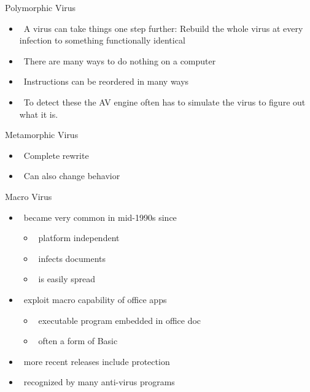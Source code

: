 \documentclass{beamer}
\begin{document}
\begin{frame}{Polymorphic Virus }
  \begin{itemize}
  \item  A virus can take things one step further: 
    Rebuild the whole virus at every infection to 
    something functionally identical 
  \item  There are many ways to do nothing on a 
    computer 
  \item  Instructions can be reordered in many ways 
  \item  To detect these the AV engine often has to 
    simulate the virus to figure out what it is.
  \end{itemize}
\end{frame}

\begin{frame}{Metamorphic Virus}
  \begin{itemize}
  \item  Complete rewrite 
  \item  Can also change behavior
  \end{itemize}
\end{frame}
 
\begin{frame}{Macro Virus }
  \begin{itemize}
  \item  became very common in mid-1990s since 
    \begin{itemize}
    \item  platform independent 
    \item  infects documents 
    \item  is easily spread 
    \end{itemize}
  \item  exploit macro capability of office apps 
    \begin{itemize}
    \item  executable program embedded in office doc 
    \item  often a form of Basic 
    \end{itemize}
  \item  more recent releases include protection 
  \item  recognized by many anti-virus programs 
  \end{itemize}
\end{frame}
\end{document}
